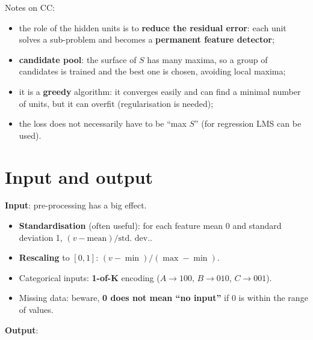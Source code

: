 Notes on CC:

\begin{itemize}
\tightlist
\item
  the role of the hidden units is to \textbf{reduce the residual
  error}: each unit solves a sub-problem and becomes a
  \textbf{permanent feature detector};
\item
  \textbf{candidate pool}: the surface of \(S\) has many maxima, so a
  group of candidates is trained and the best one is chosen, avoiding
  local maxima;
\item
  it is a \textbf{greedy} algorithm: it converges easily and can find a
  minimal number of units, but it can overfit (regularisation is
  needed);
\item
  the loss does not necessarily have to be ``max \(S\)'' (for
  regression LMS can be used).
\end{itemize}

\section{Input and output}\label{input-e-output}

\textbf{Input}: pre-processing has a big effect.

\begin{itemize}
\tightlist
\item
  \textbf{Standardisation} (often useful): for each feature mean 0 and
  standard deviation 1, \((v - \text{mean})/\text{std.\ dev.}\).
\item
  \textbf{Rescaling} to \([0,1]\): \((v - \min)/(\max - \min)\).
\item
  Categorical inputs: \textbf{1-of-K} encoding (\(A \to 100\),
  \(B \to 010\), \(C \to 001\)).
\item
  Missing data: beware, \textbf{0 does not mean ``no input''} if 0 is
  within the range of values.
\end{itemize}

\textbf{Output}:

